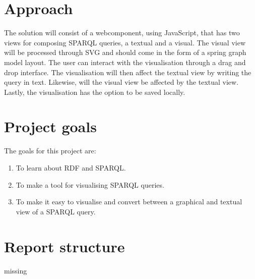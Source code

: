 \section{Approach}
The solution will consist of a webcomponent, using JavaScript, that has two views for composing SPARQL queries, a textual and a visual. The visual view will be processed through SVG and should come in the form of a spring graph model layout. The user can interact with the visualisation through a drag and drop interface. The visualisation will then affect the textual view by writing the query in text. Likewise, will the visual view be affected by the textual view. Lastly, the visualisation has the option to be saved locally.

\section{Project goals}
The goals for this project are:
\begin{enumerate}
    \item To learn about RDF and SPARQL.
    \item To make a tool for visualising SPARQL queries.
    \item To make it easy to visualise and convert between a graphical and textual view of a SPARQL query.
\end{enumerate}

\section{Report structure}
{\color{red}missing\\}